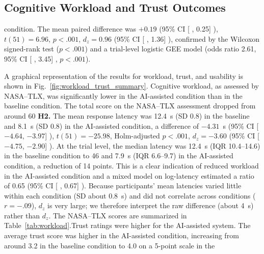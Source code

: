 \documentclass[journal]{IEEEtran}
\theoremstyle{plain}
\theoremstyle{definition}
\providecommand{\DIFaddtex}[1]{{\protect\color{blue} \sf #1}} %
\providecommand{\DIFdeltex}[1]{{\protect\color{red} \scriptsize #1}} %
\providecommand{\DIFaddbegin}{} %
\providecommand{\DIFaddend}{} %
\providecommand{\DIFdelbegin}{} %
\providecommand{\DIFdelend}{} %
\providecommand{\DIFadd}[1]{\texorpdfstring{\DIFaddtex{#1}}{#1}} %
\providecommand{\DIFdel}[1]{\texorpdfstring{\DIFdeltex{#1}}{}} %
\newcommand{\DIFscaledelfig}{0.5}
\newlength{\DIFdelgraphicswidth} %
\newlength{\DIFdelgraphicsheight} %
\newcommand{\DIFaddincludegraphics}[2][]{{\color{blue}\fbox{\DIFOincludegraphics[#1]{#2}}}} %
\newcommand{\DIFdelincludegraphics}[2][]{%
\sbox{\DIFdelgraphicsbox}{\DIFOincludegraphics[#1]{#2}}%
\settoboxwidth{\DIFdelgraphicswidth}{\DIFdelgraphicsbox} %
\settoboxtotalheight{\DIFdelgraphicsheight}{\DIFdelgraphicsbox} %
\scalebox{\DIFscaledelfig}{%
\parbox[b]{\DIFdelgraphicswidth}{\usebox{\DIFdelgraphicsbox}\\[-\baselineskip] \rule{\DIFdelgraphicswidth}{0em}}\llap{\resizebox{\DIFdelgraphicswidth}{\DIFdelgraphicsheight}{%
\setlength{\unitlength}{\DIFdelgraphicswidth}%
\begin{picture}(1,1)%
\thicklines\linethickness{2pt} %
{\color[rgb]{1,0,0}\put(0,0){\framebox(1,1){}}}%
{\color[rgb]{1,0,0}\put(0,0){\line( 1,1){1}}}%
{\color[rgb]{1,0,0}\put(0,1){\line(1,-1){1}}}%
\end{picture}%
}\hspace*{3pt}}} %
} %
\DeclareRobustCommand{\DIFaddbegin}{\DIFOaddbegin \let\includegraphics\DIFaddincludegraphics} %
\DeclareRobustCommand{\DIFaddend}{\DIFOaddend \let\includegraphics\DIFOincludegraphics} %
\DeclareRobustCommand{\DIFdelbegin}{\DIFOdelbegin \let\includegraphics\DIFdelincludegraphics} %
\DeclareRobustCommand{\DIFdelend}{\DIFOaddend \let\includegraphics\DIFOincludegraphics} %
\begin{document}
\subsection{\DIFdel{Cognitive Workload and Trust Outcomes}}
\addtocounter{subsection}{-1}%
\DIFdelend \DIFaddbegin \DIFadd{condition. The mean paired difference was $+0.19$ (95\% CI }[\DIFadd{0.14, 0.25}]\DIFadd{), $t(51)=6.96$, $p<.001$, $d_z=0.96$ (95\% CI }[\DIFadd{0.67, 1.36}]\DIFadd{), confirmed by the Wilcoxon signed-rank test ($p<.001$) and a trial-level logistic GEE model (odds ratio 2.61, 95\% CI }[\DIFadd{1.98, 3.45}]\DIFadd{, $p<.001$).
}\DIFaddend 

    \DIFdelbegin \DIFdel{A graphical representation of the results for workload, trust, and usability is shown in Fig.~\ref{fig:workload_trust_summary}.
    Cognitive workload, as assessed by NASA--TLX, was significantly lower in the AI-assisted condition than in the baseline condition. The total score on the NASA--TLX assessment dropped from around 60 }\DIFdelend \DIFaddbegin \DIFadd{\textbf{H2.} The mean response latency was 12.4~s (SD 0.8) in the baseline and 8.1~s (SD 0.8) in the AI-assisted condition, a difference of $-4.31$~s (95\% CI }[\DIFadd{$-4.64$, $-3.97$}]\DIFadd{), $t(51)=-25.98$, Holm-adjusted $p<.001$, $d_z=-3.60$ (95\% CI }[\DIFadd{$-4.75$, $-2.90$}]\DIFadd{). At the trial level, the median latency was 12.4~s (IQR 10.4--14.6) }\DIFaddend in the baseline \DIFdelbegin \DIFdel{condition to 46 }\DIFdelend \DIFaddbegin \DIFadd{and 7.9~s (IQR 6.6--9.7) }\DIFaddend in the AI-assisted condition, \DIFdelbegin \DIFdel{a reduction of 14 points. This is a clear indication of reduced workload in the AI-assisted condition}\DIFdelend \DIFaddbegin \DIFadd{and a mixed model on log-latency estimated a ratio of 0.65 (95\% CI }[\DIFadd{0.63, 0.67}]\DIFadd{). Because participants' mean latencies varied little within each condition (SD about 0.8~s) and did not correlate across conditions ($r=-.09$), $d_z$ is very large; we therefore interpret the raw difference (about 4~s) rather than $d_z$}\DIFaddend .
\DIFdelbegin \DIFdel{The NASA--TLX scores are summarized in Table~\ref{tab:workload}.Trust ratings were higher for the AI-assisted system. The average trust score was higher in the AI-assisted condition, increasing from around 3.2 in the baseline condition to 4.0 on a 5-point scale in the }\DIFdelend \DIFaddbegin 
\end{document}
